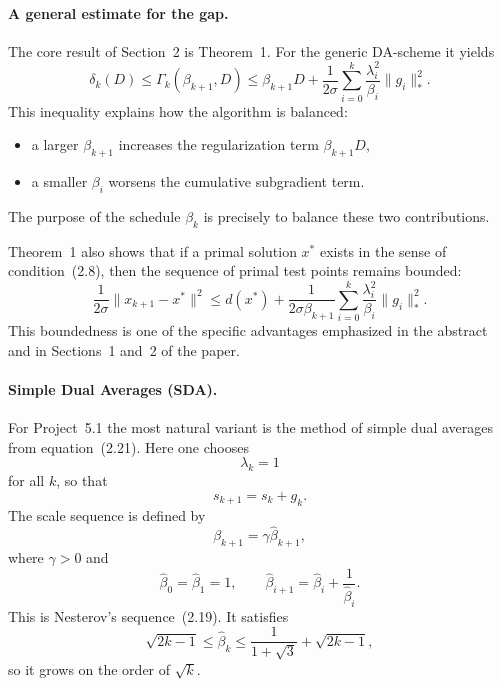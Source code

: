 \documentclass[12pt,a4paper]{article}
\begin{document}
\paragraph{A general estimate for the gap.}
The core result of Section~2 is Theorem~1. For the generic DA-scheme it yields
\begin{equation}
    \delta_k(D)
    \le
    \Gamma_k(\beta_{k+1},D)
    \le
    \beta_{k+1}D + \frac{1}{2\sigma}
    \sum_{i=0}^k \frac{\lambda_i^2}{\beta_i}\|g_i\|_*^2.
    \label{eq:general-gap-bound}
\end{equation}
This inequality explains how the algorithm is balanced:
\begin{itemize}[leftmargin=1.2cm]
    \item a larger $\beta_{k+1}$ increases the regularization term $\beta_{k+1}D$,
    \item a smaller $\beta_i$ worsens the cumulative subgradient term.
\end{itemize}
The purpose of the schedule $\beta_k$ is precisely to balance these two contributions.

Theorem~1 also shows that if a primal solution $x^*$ exists in the sense of condition~(2.8), then the sequence of primal test points remains bounded:
\begin{equation}
    \frac{1}{2\sigma}\|x_{k+1}-x^*\|^2
    \le
    d(x^*) + \frac{1}{2\sigma\beta_{k+1}}
    \sum_{i=0}^k \frac{\lambda_i^2}{\beta_i}\|g_i\|_*^2.
\end{equation}
This boundedness is one of the specific advantages emphasized in the abstract and in Sections~1 and~2 of the paper.

\paragraph{Simple Dual Averages (SDA).}
For Project~5.1 the most natural variant is the method of simple dual averages from equation~(2.21). Here one chooses
\begin{equation}
    \lambda_k = 1
\end{equation}
for all $k$, so that
\begin{equation}
    s_{k+1} = s_k + g_k.
\end{equation}
The scale sequence is defined by
\begin{equation}
    \beta_{k+1} = \gamma \hat{\beta}_{k+1},
\end{equation}
where $\gamma>0$ and
\begin{equation}
    \hat{\beta}_0 = \hat{\beta}_1 = 1,
    \qquad
    \hat{\beta}_{i+1} = \hat{\beta}_i + \frac{1}{\hat{\beta}_i}.
    \label{eq:beta-hat}
\end{equation}
This is Nesterov's sequence~(2.19). It satisfies
\begin{equation}
    \sqrt{2k-1} \le \hat{\beta}_k \le \frac{1}{1+\sqrt{3}} + \sqrt{2k-1},
\end{equation}
so it grows on the order of $\sqrt{k}$.
\end{document}
